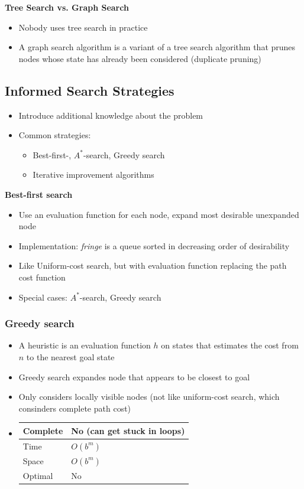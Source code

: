 \documentclass{scrartcl}
\begin{document}
\textbf{Tree Search vs. Graph Search}
\begin{itemize}
    \item
        Nobody uses tree search in practice
    \item
        A graph search algorithm is a variant of a tree search algorithm that prunes nodes whose state has already been considered (duplicate pruning)
\end{itemize}
\subsection{Informed Search Strategies}
\begin{itemize}
    \item
        Introduce additional knowledge about the problem
    \item
        Common strategies:
        \begin{itemize}
            \item
                Best-first-, $A^*$-search, Greedy search
            \item
                Iterative improvement algorithms
        \end{itemize}
\end{itemize}
\textbf{Best-first search}
\begin{itemize}
    \item
        Use an evaluation function for each node, expand most desirable unexpanded node
    \item
        Implementation: \textit{fringe} is a queue sorted in decreasing order of desirability
    \item
        Like Uniform-cost search, but with evaluation function replacing the path cost function
    \item
        Special cases: $A^*$-search, Greedy search
\end{itemize}
\subsubsection{Greedy search}
\begin{itemize}
    \item
        A heuristic is an evaluation function $h$ on states that estimates the cost from $n$ to the nearest goal state
    \item
        Greedy search expandes node that appears to be closest to goal
    \item
        Only considers locally visible nodes (not like uniform-cost search, which consinders complete path cost)
    \item
        \begin{tabular}{|l|l|}
            \hline
            Complete & No (can get stuck in loops)\\ \hline
            Time & $O(b^m)$\\ \hline
            Space & $O(b^m)$\\ \hline
            Optimal & No \\ \hline
        \end{tabular}
\end{itemize}
\end{document}
